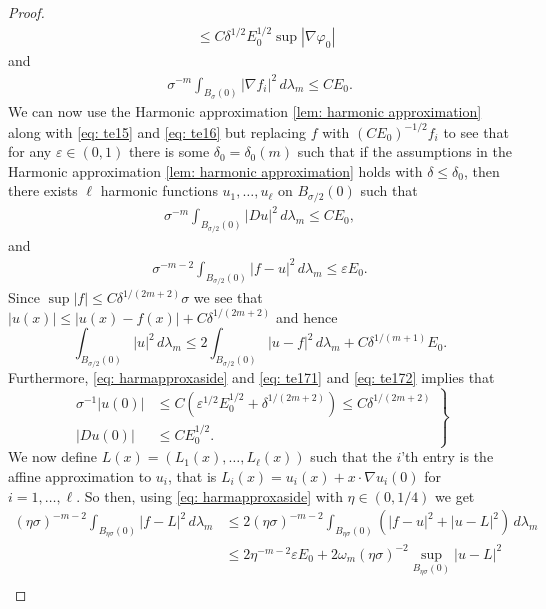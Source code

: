 \begin{proof}
\begin{align}
    &\le C\delta^{1/2}E_0^{1/2} \sup|\nabla\varphi_0|\label{eq: te15}
\end{align}
and
\begin{align}
    \sigma^{-m}\int_{B_{\sigma}(0)} |\nabla f_i|^2\, d\lambda_m \le CE_0. \label{eq: te16}
\end{align}
We can now use the Harmonic approximation \cref{lem: harmonic approximation} along with \eqref{eq: te15} and \eqref{eq: te16} but replacing $f$ with $(CE_0)^{-1/2}f_i$ to see that for any $\varepsilon \in (0,1)$ there is some $\delta_0 = \delta_0(m)$ such that if the assumptions in the Harmonic approximation \cref{lem: harmonic approximation} holds with $\delta \le \delta_0$, then there exists $\ell$ harmonic functions $u_1, \dots, u_{\ell}$ on $B_{\sigma/2}(0)$ such that
\begin{align}
    \sigma^{-m} \int_{B_{\sigma/2}(0)} |Du|^2 \, d\lambda_m \le CE_0,\label{eq: te171}
\end{align}
and
\begin{align}
    \sigma^{-m-2} \int_{B_{\sigma/2}(0)} |f-u|^2 \, d\lambda_m \le \varepsilon E_0.\label{eq: te172}
\end{align}
Since $\sup|f| \le C\delta^{1/(2m+2)}\sigma$ we see that $|u(x)| \le |u(x)-f(x)| + C\delta^{1/(2m+2)}$ and hence
\[
    \int_{B_{\sigma/2}(0)} |u|^2\, d\lambda_m \le 2\int_{B_{\sigma/2}(0)} |u-f|^2\, d\lambda_m + C\delta^{1/(m+1)}E_0.
\]
Furthermore, \eqref{eq: harmapproxaside} and \eqref{eq: te171} and \eqref{eq: te172} implies that
\begin{equation}
    \left.\begin{aligned}
        \sigma^{-1}|u(0)| &\le C(\varepsilon^{1/2}E_0^{1/2} + \delta^{1/(2m+2)}) \le C\delta^{1/(2m+2)}\label{eq: te18} \\
        |Du(0)| &\le CE_0^{1/2}.
    \end{aligned}\right\}
\end{equation}
We now define $L(x)=(L_1(x), \dots, L_{\ell}(x))$ such that the $i$'th entry is the affine approximation to $u_i$, that is $L_i(x)=u_i(x) + x\cdot \nabla u_i(0)$ for $i = 1, \dots, \ell$. So then, using \eqref{eq: harmapproxaside} with $\eta \in (0,1/4)$ we get
\begin{align}
    (\eta\sigma)^{-m-2} \int_{B_{\eta\sigma}(0)} |f-L|^2\, d\lambda_m &\le 2(\eta\sigma)^{-m-2} \int_{B_{\eta\sigma}(0)} (|f-u|^2 + |u-L|^2)\, d\lambda_m \nonumber \\
    &\le 2\eta^{-m-2}\varepsilon E_0 + 2\omega_m(\eta\sigma)^{-2}\sup_{B_{\eta\sigma}(0)} |u-L|^2 \nonumber\\

\end{align}
\end{proof}
